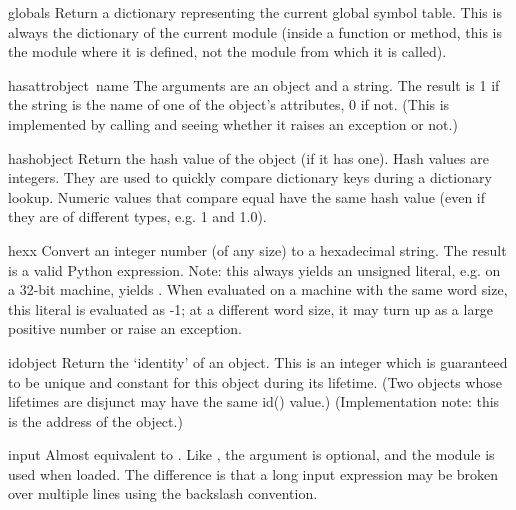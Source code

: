 \begin{funcdesc}{globals}{}
Return a dictionary representing the current global symbol table.
This is always the dictionary of the current module (inside a
function or method, this is the module where it is defined, not the
module from which it is called).
\end{funcdesc}

\begin{funcdesc}{hasattr}{object\, name}
  The arguments are an object and a string.  The result is 1 if the
  string is the name of one of the object's attributes, 0 if not.
  (This is implemented by calling  and
  seeing whether it raises an exception or not.)
\end{funcdesc}

\begin{funcdesc}{hash}{object}
  Return the hash value of the object (if it has one).  Hash values
  are integers.  They are used to quickly compare dictionary
  keys during a dictionary lookup.  Numeric values that compare equal
  have the same hash value (even if they are of different types, e.g.
  1 and 1.0).
\end{funcdesc}

\begin{funcdesc}{hex}{x}
  Convert an integer number (of any size) to a hexadecimal string.
  The result is a valid Python expression.  Note: this always yields
  an unsigned literal, e.g. on a 32-bit machine,  yields
  .  When evaluated on a machine with the same
  word size, this literal is evaluated as -1; at a different word
  size, it may turn up as a large positive number or raise an
   exception.
\end{funcdesc}

\begin{funcdesc}{id}{object}
  Return the `identity' of an object.  This is an integer which is
  guaranteed to be unique and constant for this object during its
  lifetime.  (Two objects whose lifetimes are disjunct may have the
  same id() value.)  (Implementation note: this is the address of the
  object.)
\end{funcdesc}

\begin{funcdesc}{input}{}
  Almost equivalent to .  Like
  , the  argument is optional, and the
   module is used when loaded.  The difference
  is that a long input expression may be broken over multiple lines using
  the backslash convention.
\end{funcdesc}

